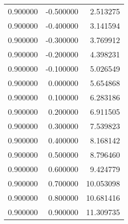 \begin{tabular}{rrr}
0.900000 & -0.500000 & 2.513275 \\
0.900000 & -0.400000 & 3.141594 \\
0.900000 & -0.300000 & 3.769912 \\
0.900000 & -0.200000 & 4.398231 \\
0.900000 & -0.100000 & 5.026549 \\
0.900000 & 0.000000 & 5.654868 \\
0.900000 & 0.100000 & 6.283186 \\
0.900000 & 0.200000 & 6.911505 \\
0.900000 & 0.300000 & 7.539823 \\
0.900000 & 0.400000 & 8.168142 \\
0.900000 & 0.500000 & 8.796460 \\
0.900000 & 0.600000 & 9.424779 \\
0.900000 & 0.700000 & 10.053098 \\
0.900000 & 0.800000 & 10.681416 \\
0.900000 & 0.900000 & 11.309735 \\
\bottomrule
\end{tabular}
